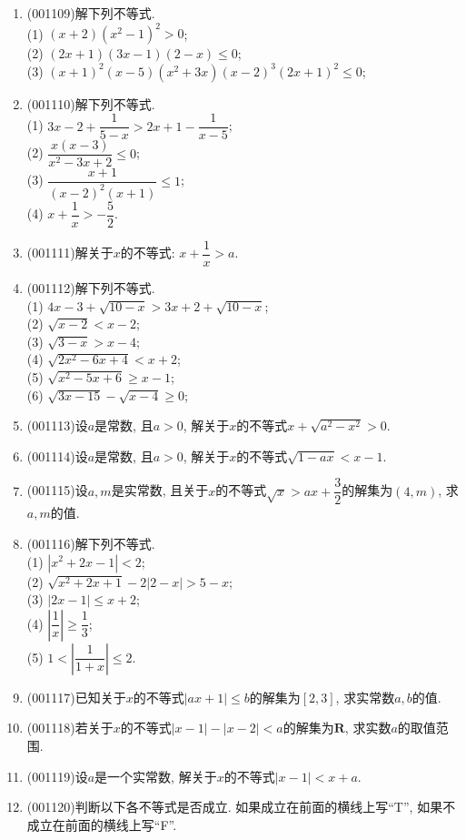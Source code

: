 \documentclass[10pt,a4paper]{article}
\begin{document}
\begin{enumerate}[1.]
\item {\tiny (001109)}解下列不等式.\\ 
(1) $(x+2)(x^2-1)^2>0$;\\ 
(2) $(2x+1)(3x-1)(2-x)\le 0$;\\ 
(3) $(x+1)^2(x-5)(x^2+3x)(x-2)^3(2x+1)^2\le 0$;
\item {\tiny (001110)}解下列不等式.\\ 
(1) $3x-2+\dfrac{1}{5-x}>2x+1-\dfrac{1}{x-5}$;\\ 
(2) $\dfrac{x(x-3)}{x^2-3x+2}\le0$;\\ 
(3) $\dfrac{x+1}{(x-2)^2(x+1)}\le1$;\\ 
(4) $x+\dfrac 1x>-\dfrac 52$.
\item {\tiny (001111)}解关于$x$的不等式: $x+\dfrac 1x>a$.
\item {\tiny (001112)}解下列不等式.\\ 
(1) $4x-3+\sqrt{10-x}>3x+2+\sqrt{10-x}$;\\ 
(2) $\sqrt{x-2}<x-2$;\\ 
(3) $\sqrt{3-x}>x-4$;\\ 
(4) $\sqrt{2x^2-6x+4}<x+2$;\\ 
(5) $\sqrt{x^2-5x+6}\geq x-1$;\\ 
(6) $\sqrt{3x-15}-\sqrt{x-4}\ge0$;
\item {\tiny (001113)}设$a$是常数, 且$a>0$, 解关于$x$的不等式$x+\sqrt{a^2-x^2}>0$.
\item {\tiny (001114)}设$a$是常数, 且$a>0$, 解关于$x$的不等式$\sqrt{1-ax}<x-1$.
\item {\tiny (001115)}设$a,m$是实常数, 且关于$x$的不等式$\sqrt{x}>ax+\dfrac{3}{2}$的解集为$(4,m)$, 求$a,m$的值.
\item {\tiny (001116)}解下列不等式.\\ 
(1) $|x^2+2x-1|<2$;\\ 
(2) $\sqrt{x^2+2x+1}-2|2-x|>5-x$;\\ 
(3) $|2x-1|\le x+2$;\\ 
(4) $\left|\dfrac 1x\right|\ge \dfrac 13$;\\ 
(5) $1<\left|\dfrac 1{1+x}\right|\le 2$.
\item {\tiny (001117)}已知关于$x$的不等式$|ax+1|\leq b$的解集为$[2,3]$, 求实常数$a,b$的值.
\item {\tiny (001118)}若关于$x$的不等式$|x-1|-|x-2|<a$的解集为$\mathbf{R}$, 求实数$a$的取值范围.
\item {\tiny (001119)}设$a$是一个实常数, 解关于$x$的不等式$|x-1|<x+a$.
\item {\tiny (001120)}判断以下各不等式是否成立. 如果成立在前面的横线上写``T'', 如果不成立在前面的横线上写``F''.\\ 

\end{enumerate}
\end{document}
